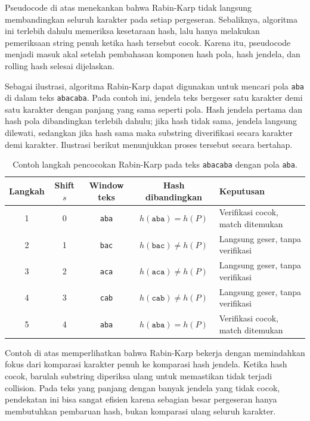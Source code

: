 Pseudocode di atas menekankan bahwa Rabin-Karp tidak langsung membandingkan seluruh karakter pada setiap pergeseran. Sebaliknya, algoritma ini terlebih dahulu memeriksa kesetaraan hash, lalu hanya melakukan pemeriksaan string penuh ketika hash tersebut cocok. Karena itu, pseudocode menjadi masuk akal setelah pembahasan komponen hash pola, hash jendela, dan rolling hash selesai dijelaskan.

Sebagai ilustrasi, algoritma Rabin-Karp dapat digunakan untuk mencari pola \texttt{aba} di dalam teks \texttt{abacaba}. Pada contoh ini, jendela teks bergeser satu karakter demi satu karakter dengan panjang yang sama seperti pola. Hash jendela pertama dan hash pola dibandingkan terlebih dahulu; jika hash tidak sama, jendela langsung dilewati, sedangkan jika hash sama maka substring diverifikasi secara karakter demi karakter. Ilustrasi berikut menunjukkan proses tersebut secara bertahap.

\begin{table}[H]
    \centering
    \caption{Contoh langkah pencocokan Rabin-Karp pada teks \texttt{abacaba} dengan pola \texttt{aba}.}
    \small
    \setlength{\tabcolsep}{4pt}
    \begin{tabularx}{\textwidth}{c c c c >{\raggedright\arraybackslash}X}
        \toprule
        Langkah & Shift $s$ & Window teks  & Hash dibandingkan           & Keputusan                         \\
        \midrule
        1       & 0         & \texttt{aba} & $h(\texttt{aba}) = h(P)$    & Verifikasi cocok, match ditemukan \\
        2       & 1         & \texttt{bac} & $h(\texttt{bac}) \neq h(P)$ & Langsung geser, tanpa verifikasi  \\
        3       & 2         & \texttt{aca} & $h(\texttt{aca}) \neq h(P)$ & Langsung geser, tanpa verifikasi  \\
        4       & 3         & \texttt{cab} & $h(\texttt{cab}) \neq h(P)$ & Langsung geser, tanpa verifikasi  \\
        5       & 4         & \texttt{aba} & $h(\texttt{aba}) = h(P)$    & Verifikasi cocok, match ditemukan \\
        \bottomrule
    \end{tabularx}
\end{table}

Contoh di atas memperlihatkan bahwa Rabin-Karp bekerja dengan memindahkan fokus dari komparasi karakter penuh ke komparasi hash jendela. Ketika hash cocok, barulah substring diperiksa ulang untuk memastikan tidak terjadi collision. Pada teks yang panjang dengan banyak jendela yang tidak cocok, pendekatan ini bisa sangat efisien karena sebagian besar pergeseran hanya membutuhkan pembaruan hash, bukan komparasi ulang seluruh karakter.

